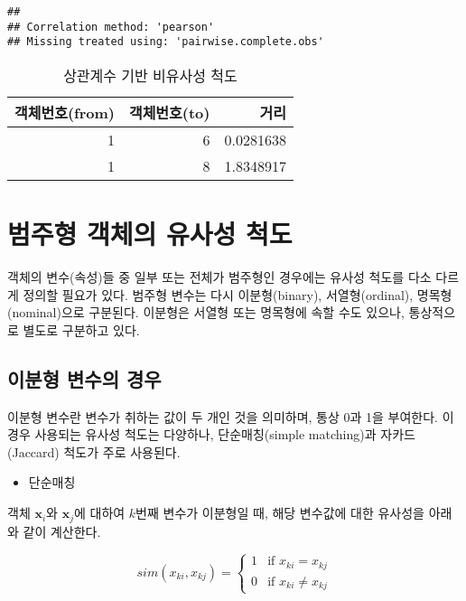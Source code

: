 \documentclass[]{book}
\providecommand{\tightlist}{%
  \setlength{\itemsep}{0pt}\setlength{\parskip}{0pt}}
\begin{document}
\begin{verbatim}
## 
## Correlation method: 'pearson'
## Missing treated using: 'pairwise.complete.obs'
\end{verbatim}

\begin{table}[t]

\caption{\label{tab:std-correlation-dissimilarity}상관계수 기반 비유사성 척도}
\centering
\begin{tabular}{rrr}
\toprule
객체번호(from) & 객체번호(to) & 거리\\
\midrule
1 & 6 & 0.0281638\\
1 & 8 & 1.8348917\\
\bottomrule
\end{tabular}
\end{table}

\hypertarget{category-similarity-metric}{%
\section{범주형 객체의 유사성 척도}\label{category-similarity-metric}}

객체의 변수(속성)들 중 일부 또는 전체가 범주형인 경우에는 유사성 척도를 다소 다르게 정의할 필요가 있다. 범주형 변수는 다시 이분형(binary), 서열형(ordinal), 명목형(nominal)으로 구분된다. 이분형은 서열형 또는 명목형에 속할 수도 있으나, 통상적으로 별도로 구분하고 있다.

\hypertarget{binary-similarity-metric}{%
\subsection{이분형 변수의 경우}\label{binary-similarity-metric}}

이분형 변수란 변수가 취하는 값이 두 개인 것을 의미하며, 통상 0과 1을 부여한다. 이 경우 사용되는 유사성 척도는 다양하나, 단순매칭(simple matching)과 자카드(Jaccard) 척도가 주로 사용된다.

\begin{itemize}
\tightlist
\item
  단순매칭
\end{itemize}

객체 \(\mathbf{x}_i\)와 \(\mathbf{x}_j\)에 대하여 \(k\)번째 변수가 이분형일 때, 해당 변수값에 대한 유사성을 아래와 같이 계산한다.

\begin{equation*}
sim(x_{ki}, x_{kj}) = \begin{cases}
1 & \text{if } x_{ki} = x_{kj}\\
0 & \text{if } x_{ki} \neq x_{kj}
\end{cases}
\end{equation*}
\end{document}
